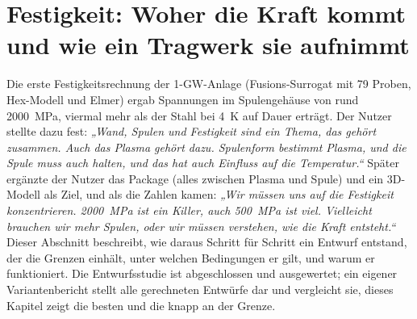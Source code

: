 \section{Festigkeit: Woher die Kraft kommt und wie ein Tragwerk sie aufnimmt}\label{sec:festigkeit}

Die erste Festigkeitsrechnung der 1-GW-Anlage (Fusions-Surrogat mit 79 Proben, Hex-Modell und Elmer) ergab Spannungen im Spulengehäuse von
rund \SI{2000}{MPa}, viermal mehr als der Stahl bei \SI{4}{K} auf Dauer erträgt. Der Nutzer stellte dazu fest:
\emph{„Wand, Spulen und Festigkeit sind ein Thema, das gehört zusammen. Auch das Plasma gehört dazu. Spulenform
bestimmt Plasma, und die Spule muss auch halten, und das hat auch Einfluss auf die Temperatur.“} Später ergänzte der Nutzer
das Package (alles zwischen Plasma und Spule) und ein 3D-Modell als Ziel, und als die Zahlen kamen:
\emph{„Wir müssen uns auf die Festigkeit konzentrieren. 2000~MPa ist ein Killer, auch 500~MPa ist viel. Vielleicht
brauchen wir mehr Spulen, oder wir müssen verstehen, wie die Kraft entsteht.“} Dieser Abschnitt beschreibt, wie
daraus Schritt für Schritt ein Entwurf entstand, der die Grenzen einhält, unter welchen Bedingungen er gilt, und
warum er funktioniert. Die Entwurfsstudie ist abgeschlossen und ausgewertet; ein eigener Variantenbericht stellt alle gerechneten Entwürfe dar und vergleicht sie, dieses Kapitel zeigt die besten und die knapp an der Grenze.

